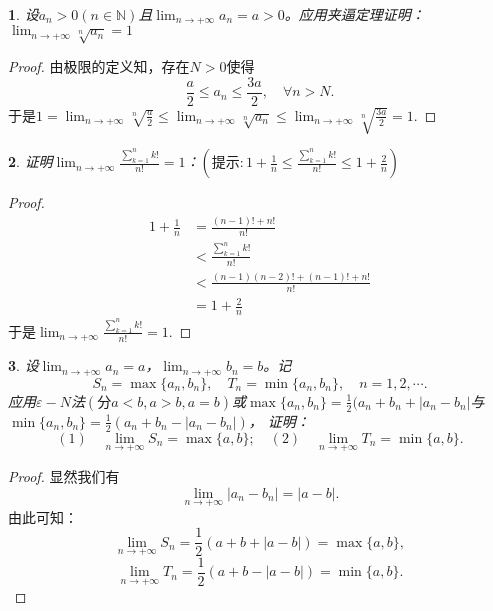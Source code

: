 \documentclass[utf8]{book}
\newtheorem{example}{}[section]             %
\begin{document}
\begin{example}
设$a_n > 0 (n\in\mathbb{N})$且$\displaystyle \lim_{n\to +\infty}a_n = a > 0$。应用夹逼定理证明：$\displaystyle \lim_{n\to +\infty}\sqrt[n]{a_n} = 1$
\end{example}
\begin{proof}
由极限的定义知，存在$N>0$使得$$\frac{a}{2}\leq a_n \leq \frac{3a}{2},\quad\forall n > N.$$
于是$1=\displaystyle \lim_{n\to +\infty}\sqrt[n]{\frac{a}{2}}\leq \displaystyle \lim_{n\to +\infty}\sqrt[n]{a_n} \leq \displaystyle \lim_{n\to +\infty}\sqrt[n]{\frac{3a}{2}}=1$.
\end{proof}
\begin{example}
证明$\displaystyle \lim_{n\to +\infty}\frac{\displaystyle\sum_{k=1}^nk!}{n!} = 1$：$\left(\text{提示}: 1+\displaystyle\frac{1}{n}\leq\frac{\displaystyle\sum_{k=1}^nk!}{n!}\leq 1+ \displaystyle\frac{2}{n}\right)$
\end{example}
\begin{proof}
\begin{equation*}
\begin{split}
1+\frac{1}{n} &= \frac{(n-1)!+n!}{n!} \\&< \frac{\displaystyle\sum_{k=1}^nk!}{n!} \\&< \frac{(n-1)(n-2)!+(n-1)!+n!}{n!} \\
&= 1 +\frac{2}{n}
\end{split}
\end{equation*}
于是$\displaystyle \lim_{n\to +\infty}\frac{\displaystyle\sum_{k=1}^nk!}{n!} = 1$.
\end{proof}
\begin{example}
设$\displaystyle \lim_{n\to +\infty}a_n = a$，$\displaystyle \lim_{n\to +\infty}b_n = b$。记
$$S_n=\max\{a_n, b_n\}, \quad T_n = \min\{a_n, b_n\}, \quad n = 1,2,\cdots.$$
应用$\varepsilon-N$法$(\text{分} a < b, a>b, a=b)$或$\max\{a_n,b_n\} = \frac{1}{2}(a_n+b_n+|a_n-b_n|$与$\min\{a_n,b_n\} = \frac{1}{2}(a_n+b_n-|a_n-b_n|)$，
证明：
$$(1)\quad \displaystyle \lim_{n\to +\infty}S_n = \max\{a, b\}; \quad (2)\quad \displaystyle \lim_{n\to +\infty}T_n = \min\{a, b\}.$$
\end{example}
\begin{proof}
显然我们有$$\displaystyle \lim_{n\to +\infty}|a_n-b_n| = |a-b|.$$
由此可知：
$$\displaystyle \lim_{n\to +\infty}S_n = \frac{1}{2}(a+b+|a-b|) = \max\{a,b\},$$
$$\displaystyle \lim_{n\to +\infty}T_n = \frac{1}{2}(a+b-|a-b|) = \min\{a,b\}.$$
\end{proof}
\end{document}
